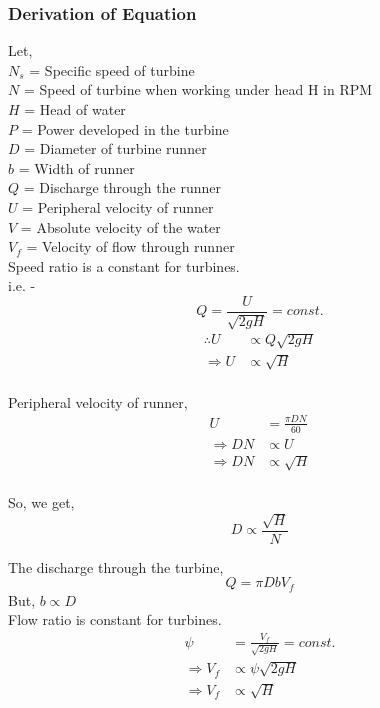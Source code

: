 \documentclass{article}
\begin{document}
\begin{multicols}{2}
      \subsubsection*{Derivation of Equation}
      Let,\\
      $N_s$ = Specific speed of turbine \\
      $N$ = Speed of turbine when working under head H in RPM\\
      $H$ = Head of water \\
      $P$ = Power developed in the turbine \\
      $D$ = Diameter of turbine runner \\
      $b$ = Width of runner \\
      $Q$ = Discharge through the runner \\
      $U$ = Peripheral velocity of runner \\
      $V$ = Absolute velocity of the water \\
      $V_f$ = Velocity of flow through runner \\

      Speed ratio is a constant for turbines.\\
      i.e. - $$Q = \frac{U}{\sqrt{2 g H}} = const.$$
      \begin{align*}
        \therefore U &\propto Q \sqrt{2 g H} \\
        \Rightarrow U &\propto \sqrt{H} \\
      \end{align*}

      Peripheral velocity of runner,
      \begin{align*}
        U &= \frac{\pi D N}{60} \\
        \Rightarrow DN &\propto U \\
        \Rightarrow DN &\propto \sqrt{H} \\
        \end{align*}

      So, we get,
      \begin{equation}
        D \propto \frac{\sqrt{H}}{N}
      \end{equation}

      The discharge through the turbine,
      \begin{equation}
        Q = \pi D b V_f         
      \end{equation} 
      But, $b \propto D$\\

      Flow ratio is constant for turbines.\\
      \begin{align*}
        \psi &= \frac{V_f}{\sqrt{2 g H}} = const. \\
        \Rightarrow V_f &\propto \psi \sqrt{2 g H} \\
        \Rightarrow V_f &\propto \sqrt{H} \\
      \end{align*}


\end{multicols}
\end{document}
